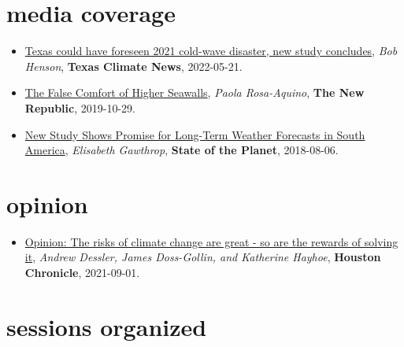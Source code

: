 \documentclass[10pt,oneside]{article}
\begin{document}

\section{media coverage}

\mbox{}\vspace{-\dimexpr\baselineskip\relax}

\begin{itemize}[label={}]
  
  \item \href{https://texasclimatenews.org/2022/05/21/texas-could-have-foreseen-2021-cold-wave-disaster-new-study-concludes/}{Texas could have foreseen 2021 cold-wave disaster, new study concludes}, \textit{Bob Henson}, \textbf{Texas Climate News}, 2022-05-21.
        
  \item \href{https://newrepublic.com/article/155519/false-comfort-higher-seawalls}{The False Comfort of Higher Seawalls}, \textit{Paola Rosa-Aquino}, \textbf{The New Republic}, 2019-10-29.
        
  \item \href{https://blogs.ei.columbia.edu/2018/08/06/subseasonal-weather-forecasts-paraguay/}{New Study Shows Promise for Long-Term Weather Forecasts in South America}, \textit{Elisabeth Gawthrop}, \textbf{State of the Planet}, 2018-08-06.
        
\end{itemize}

\section{opinion}

\mbox{}\vspace{-\dimexpr\baselineskip\relax}

\begin{itemize}[label={}]
  
  \item \href{https://www.houstonchronicle.com/opinion/outlook/article/Opinion-The-risks-of-climate-change-are-great-16426616.php}{Opinion: The risks of climate change are great - so are the rewards of solving it}, \textit{Andrew Dessler, James Doss-Gollin, and Katherine Hayhoe}, \textbf{Houston Chronicle}, 2021-09-01.
        
\end{itemize}


\section{sessions organized}
\end{document}
